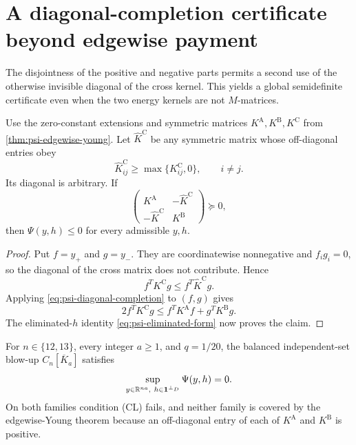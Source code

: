 \section{A diagonal-completion certificate beyond edgewise payment}

The disjointness of the positive and negative parts permits a second use of
the otherwise invisible diagonal of the cross kernel.  This yields a global
semidefinite certificate even when the two energy kernels are not
$M$-matrices.

\begin{lemma}
\label{lem:psi-diagonal-completion}
Use the zero-constant extensions and symmetric matrices
$K^{\mathrm A},K^{\mathrm B},K^{\mathrm C}$ from
\cref{thm:psi-edgewise-young}.  Let $\widehat K^{\mathrm C}$ be any symmetric
matrix whose off-diagonal entries obey
\begin{equation*}
 \widehat K^{\mathrm C}_{ij}
 \geq\max\{K^{\mathrm C}_{ij},0\},\qquad i\neq j.
\end{equation*}
Its diagonal is arbitrary.  If
\begin{equation}
 \begin{pmatrix}
  K^{\mathrm A}&-\widehat K^{\mathrm C}\\
  -\widehat K^{\mathrm C}&K^{\mathrm B}
 \end{pmatrix}\succeq0,
 \label{eq:psi-diagonal-completion}
\end{equation}
then $\Psi(y,h)\leq0$ for every admissible $y,h$.
\end{lemma}

\begin{proof}
Put $f=y_+$ and $g=y_-$.  They are coordinatewise nonnegative and
$f_ig_i=0$, so the diagonal of the cross matrix does not contribute.  Hence
\begin{equation*}
 f^TK^{\mathrm C}g
 \leq f^T\widehat K^{\mathrm C}g.
\end{equation*}
Applying \cref{eq:psi-diagonal-completion} to $(f,g)$ gives
\begin{equation*}
 2f^TK^{\mathrm C}g
 \leq f^TK^{\mathrm A}f+g^TK^{\mathrm B}g.
\end{equation*}
The eliminated-$h$ identity \cref{eq:psi-eliminated-form} now proves the
claim.
\end{proof}

\begin{theorem}
\label{thm:psi-c12-c13-diagonal-completion}
For $n\in\{12,13\}$, every integer $a\geq1$, and $q=1/20$, the balanced
independent-set blow-up $C_n[\overline K_a]$ satisfies
\begin{equation}
 \sup_{y\in\mathbb R^{na},\ h\in\one^{\perp_D}}\Psi(y,h)=0.
 \label{eq:psi-c12-c13-diagonal-completion-sup}
\end{equation}
On both families condition \textup{(CL)} fails, and neither family is
covered by the edgewise-Young theorem because an off-diagonal entry of each
of $K^{\mathrm A}$ and $K^{\mathrm B}$ is positive.
\end{theorem}

